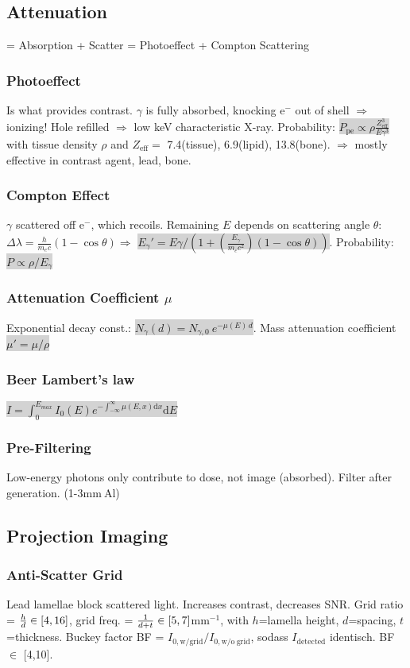 \documentclass[9pt]{article}
\newcommand{\grey}[1]{\setlength{\fboxsep}{0pt}\colorbox{lightgrey}{#1}}
\newcommand{\dif}{\mathrm{d}}
\begin{document}
\begin{multicols}{2}
\subsection{Attenuation}
= Absorption + Scatter = Photoeffect + Compton Scattering
\subsubsection{Photoeffect} 
Is what provides contrast. $\gamma$ is fully absorbed, knocking e${}^-$ out of shell $\Rightarrow$ ionizing! Hole refilled $\Rightarrow$ low keV characteristic X-ray. Probability: \grey{$P_\mathrm{pe} \propto \rho \frac{Z_{\mathrm{eff}}^3}{E\gamma^3}$} with tissue density $\rho$ and $Z_\mathrm{eff}=$ 7.4(tissue), 6.9(lipid), 13.8(bone). $\Rightarrow$ mostly effective in contrast agent, lead, bone.
\subsubsection{Compton Effect}
$\gamma$ scattered off e${}^-$, which recoils. Remaining $E$ depends on scattering angle $\theta$: $\Delta \lambda = \frac{h}{m_ec}(1-\cos \theta) \Rightarrow$ \grey{$E_\gamma' = E\gamma / \left(1 + \left( \frac{E_\gamma}{m_ec^2}\right) (1 - \cos\theta)\right)$}. Probability: \grey{$P \propto \rho/E_\gamma$}
\subsubsection{Attenuation Coefficient $\mu$}
Exponential decay const.: \grey{$N_\gamma(d) = N_{\gamma,0} \: e^{-\mu(E)\,d}$}. Mass attenuation coefficient \grey{$\mu' = \mu/\rho$}
\subsubsection{Beer Lambert's law}
\grey{$I = \int_0^{E_{max}} I_0(E) e^{-\int_{-\infty}^{\infty} \mu(E,x) \dif x} \dif E$}

\subsubsection{Pre-Filtering}
Low-energy photons only contribute to dose, not image (absorbed). Filter after generation. (1-3mm$\:$Al)

\subsection{Projection Imaging}
\subsubsection{Anti-Scatter Grid} 
Lead lamellae block scattered light. Increases contrast, decreases SNR. Grid ratio = ${h \over d} \in [4,16]$, grid freq. = ${1 \over d + t} \in [5,7]$mm${}^{-1}$, with $h$=lamella height, $d$=spacing, $t$=thickness. Buckey factor BF = $I_{0,\mathrm{w/ grid}} / I_{0,\mathrm{w/o\ grid}}$, sodass $I_\mathrm{detected}$ identisch. BF $\in$ [4,10].


\end{multicols}
\end{document}
